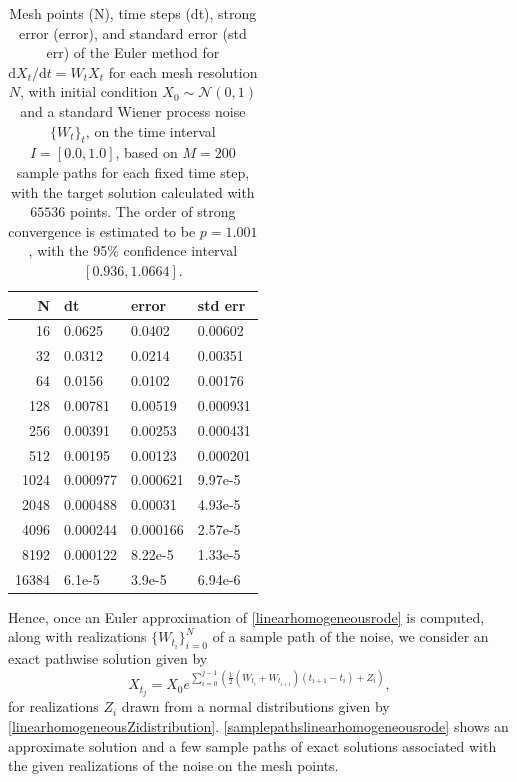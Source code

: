 \documentclass[reqno,12pt]{amsart}
\theoremstyle{plain} %
\theoremstyle{definition} %
\begin{document}
\begin{table}
    \begin{center}
        \begin{tabular}[htb]{|r|l|l|l|}
            \hline N & dt & error & std err \\
            \hline \hline
            16 & 0.0625 & 0.0402 & 0.00602 \\
            32 & 0.0312 & 0.0214 & 0.00351 \\
            64 & 0.0156 & 0.0102 & 0.00176 \\
            128 & 0.00781 & 0.00519 & 0.000931 \\
            256 & 0.00391 & 0.00253 & 0.000431 \\
            512 & 0.00195 & 0.00123 & 0.000201 \\
            1024 & 0.000977 & 0.000621 & 9.97e-5 \\
            2048 & 0.000488 & 0.00031 & 4.93e-5 \\
            4096 & 0.000244 & 0.000166 & 2.57e-5 \\
            8192 & 0.000122 & 8.22e-5 & 1.33e-5 \\
            16384 & 6.1e-5 & 3.9e-5 & 6.94e-6 \\
            \hline
        \end{tabular}
    \end{center}

    \bigskip

    \caption{Mesh points (N), time steps (dt), strong error (error), and standard error (std err) of the Euler method for $\mathrm{d}X_t/\mathrm{d}t = W_t X_t$ for each mesh resolution $N$, with initial condition $X_0 \sim \mathcal{N}(0, 1)$ and a standard Wiener process noise $\{W_t\}_t$, on the time interval $I = [0.0, 1.0]$, based on $M = 200$ sample paths for each fixed time step, with the target solution calculated with $65536$ points. The order of strong convergence is estimated to be $p = 1.001$, with the 95\% confidence interval $[0.936, 1.0664]$.}

    \label{tablinearhomogeneousrode}
\end{table}

Hence, once an Euler approximation of \cref{linearhomogeneousrode} is computed, along with realizations $\{W_{t_i}\}_{i=0}^N$ of a sample path of the noise, we consider an exact pathwise solution given by
\begin{equation}
    \label{Xtlinearhomogeneousrode}
    X_{t_j} = X_0 e^{\sum_{i = 0}^{j-1}\left(\frac{1}{2}\left(W_{t_i} + W_{t_{i+1}}\right)(t_{i+1} - t_i) + Z_i\right)},
\end{equation}
for realizations $Z_i$ drawn from a normal distributions given by \cref{linearhomogeneousZidistribution}. \cref{samplepathslinearhomogeneousrode} shows an approximate solution and a few sample paths of exact solutions associated with the given realizations of the noise on the mesh points.
\end{document}
